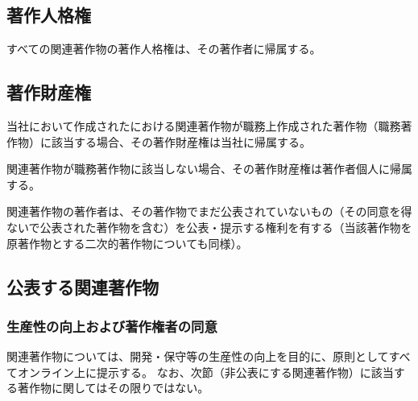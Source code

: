 \subsection{著作人格権}
すべての関連著作物の著作人格権は、その著作者に帰属する。


\subsection{著作財産権}
当社において作成された\DMname における関連著作物が職務上作成された著作物（職務著作物）に該当する場合、その著作財産権は当社に帰属する。

関連著作物が職務著作物に該当しない場合、その著作財産権は著作者個人に帰属する。



\clearpage
関連著作物の著作者は、その著作物でまだ公表されていないもの（その同意を得ないで公表された著作物を含む）を公表・提示する権利を有する（当該著作物を原著作物とする二次的著作物についても同様）。


\subsection{公表する関連著作物}

\subsubsection{生産性の向上および著作権者の同意}
関連著作物については、開発・保守等の生産性の向上を目的に、原則としてすべてオンライン上に提示する。
なお、次節（非公表にする関連著作物）に該当する著作物に関してはその限りではない。

